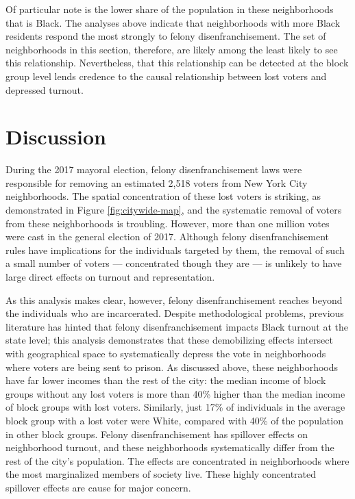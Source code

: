 \documentclass[
  12pt,
]{article}
\begin{document}
Of particular note is the lower share of the population in these neighborhoods that is Black. The analyses above indicate that neighborhoods with more Black residents respond the most strongly to felony disenfranchisement. The set of neighborhoods in this section, therefore, are likely among the least likely to see this relationship. Nevertheless, that this relationship can be detected at the block group level lends credence to the causal relationship between lost voters and depressed turnout.

\hypertarget{discussion}{%
\section*{Discussion}\label{discussion}}

During the 2017 mayoral election, felony disenfranchisement laws were responsible for removing an estimated 2,518 voters from New York City neighborhoods. The spatial concentration of these lost voters is striking, as demonstrated in Figure \ref{fig:citywide-map}, and the systematic removal of voters from these neighborhoods is troubling. However, more than one million votes were cast in the general election of 2017. Although felony disenfranchisement rules have implications for the individuals targeted by them, the removal of such a small number of voters --- concentrated though they are --- is unlikely to have large direct effects on turnout and representation.

As this analysis makes clear, however, felony disenfranchisement reaches beyond the individuals who are incarcerated. Despite methodological problems, previous literature has hinted that felony disenfranchisement impacts Black turnout at the state level; this analysis demonstrates that these demobilizing effects intersect with geographical space to systematically depress the vote in neighborhoods where voters are being sent to prison. As discussed above, these neighborhoods have far lower incomes than the rest of the city: the median income of block groups without any lost voters is more than 40\% higher than the median income of block groups with lost voters. Similarly, just 17\% of individuals in the average block group with a lost voter were White, compared with 40\% of the population in other block groups. Felony disenfranchisement has spillover effects on neighborhood turnout, and these neighborhoods systematically differ from the rest of the city's population. The effects are concentrated in neighborhoods where the most marginalized members of society live. These highly concentrated spillover effects are cause for major concern.
\end{document}
